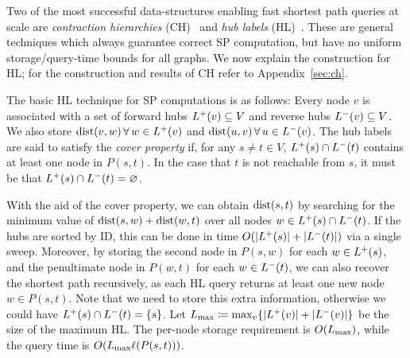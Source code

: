 Two of the most successful data-structures enabling fast shortest path queries at scale are \emph{contraction hierarchies} (CH)~\citep{geisberger_ch_definition} and \emph{hub labels} (HL)~\citep{cohen_definition_hl}.
These are general techniques which always guarantee correct SP computation, but have no uniform storage/query-time bounds for all graphs. 
We now explain the construction for HL; for the construction and results of CH refer to Appendix~\ref{sec:ch}.

The basic HL technique for SP computations is as follows:
Every node $v$ is associated with a set of forward hubs $\Lf(v)\subseteq V$ and reverse hubs $\Lb(v)\subseteq V$.
We also store $\dist(v,w) \,\forall\, w\in\Lf(v)$ and $\dist(u,v)\,\forall\,u\in\Lb(v)$.
The hub labels are said to satisfy the \emph{cover property} if, for any $s\neq t\in V$, $\Lf(s)\cap\Lb(t)$ contains at least one node in $P(s,t)$.
In the case that $t$ is not reachable from $s$, it must be that $\Lf(s)\cap\Lb(t)=\varnothing$.

With the aid of the cover property, we can obtain $\dist(s,t)$ by searching for the minimum value of $\dist(s,w)+\dist(w,t)$ over all nodes $w\in\Lf(s)\cap\Lb(t)$.
If the hubs are sorted by ID, this can be done in time $\Or(\card{\Lf(s)}+\card{\Lb(t)})$ via a single sweep.
Moreover, by storing the second node in $P(s,w)$ for each $w\in \Lf(s)$, and the penultimate node in $P(w,t)$ for each $w\in \Lb(t)$, we can also recover the shortest path recursively, as each HL query returns at least one new node $w\in P(s,t)$.
Note that we need to store this extra information, otherwise we could have $\Lf(s)\cap\Lb(t)=\crl{s}$.
Let $\Lm \defeq \max_v\crl{\abs*{\Lf(v)}+\abs*{\Lb(v)}}$ be the size of the maximum HL.
The per-node storage requirement is $\Or(\Lm)$, while the query time is $\Or(\Lm\ell(P(s,t)))$.

